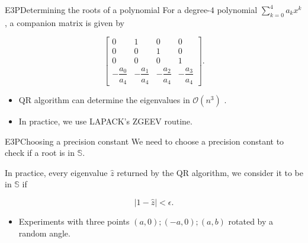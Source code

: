 \documentclass{beamer}
\newcommand{\bigO}{\mathscr{O}}
\theoremstyle{definition}
\begin{document}
\begin{frame}{E3P}{Determining the roots of a polynomial}
	For a degree-$4$ polynomial $\sum_{k=0}^4 a_k x^k$, a companion matrix is given by
	
	\begin{equation*}
	\left[\begin{array}{ccccc}
	0 & 1 & 0 & 0\\
	0 & 0 & 1 & 0\\
	0 & 0 & 0 & 1\\
	-\dfrac{a_0}{a_4} & -\dfrac{a_1}{a_4} & -\dfrac{a_2}{a_4} & -\dfrac{a_3}{a_4}
	\end{array}\right].
	\end{equation*}
	
	\begin{itemize}
		\item QR algorithm can determine the eigenvalues in $\bigO(n^3)$ \cite{watkins:2008}.
		\item In practice, we use LAPACK's ZGEEV routine.
	\end{itemize}
\end{frame}

\begin{frame}{E3P}{Choosing a precision constant}
	We need to choose a precision constant to check if a root is in $\mathbb{S}$. 
	
	In practice, every eigenvalue $\hat{z}$ returned by the QR algorithm, we consider it to be in $\mathbb{S}$ if
	
	\begin{equation*}
	|1 - \hat{z}| < \epsilon.
	\end{equation*}
	
	\begin{itemize}
		\item Experiments with three points $(a, 0); (-a, 0); (a, b)$ rotated by a random angle.
	\end{itemize}
\end{frame}
\end{document}
